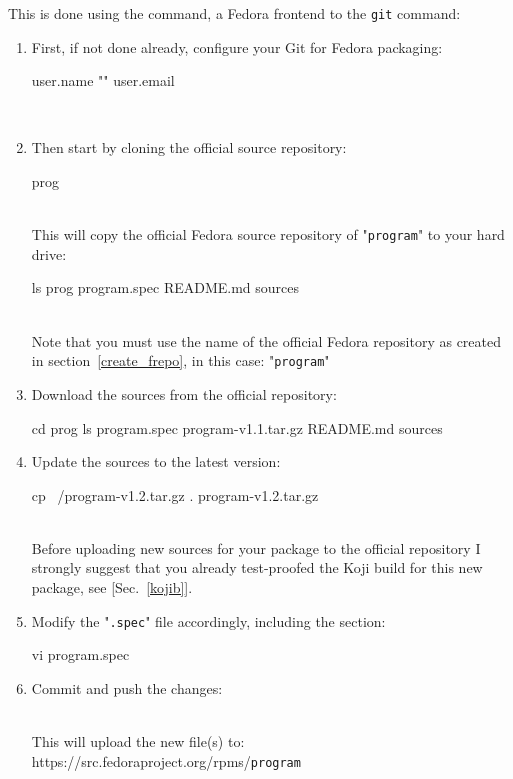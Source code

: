 This is done using the  command, a Fedora frontend to the \texttt{git} command:
\begin{enumerate}
\item First, if not done already, configure your Git for Fedora packaging: 
{\small{
\begin{scripti}
\fprompt{~}    user.name ""
\fprompt{~}    user.email \dctt{\email}
\end{scripti}}}
\\[-0.75cm]
\item Then start by cloning the official source repository: 
\begin{scripti}
\fprompt{~}   prog
\end{scripti}
\\[-0.75cm]
\noindent This will copy the official Fedora source repository of "\texttt{program}" to your hard drive:
\begin{scripti}
\fprompt{~} ls prog
program.spec README.md sources
\fprompt{~}
\end{scripti}
\\[-0.75cm]
\noindent Note that you must use the name of the official Fedora repository as created in section~\ref{create_frepo}, in this case: "\texttt{program}"  
\item Download the sources from the official repository:  
\begin{scripti}
\fprompt{~} cd prog
  
 ls
program.spec program-v1.1.tar.gz README.md sources
\end{scripti}
\item Update the sources to the latest version:
\begin{scripti}
 cp ~/program-v1.2.tar.gz .
   program-v1.2.tar.gz
\end{scripti}
\\[-0.75cm]
\noindent Before uploading new sources for your package to the official repository I strongly suggest that you already 
test-proofed the Koji build for this new package, see [Sec.~\ref{kojib}]. 
\item Modify the "\texttt{.spec}" file accordingly, including the  section:
\begin{scripti}
 vi program.spec 
\end{scripti}
\item Commit and push the changes:
\begin{scripti}
   
\end{scripti}
\\[-0.75cm]
\noindent This will upload the new file(s) to: https://src.fedoraproject.org/rpms/\texttt{program}
\end{enumerate}


